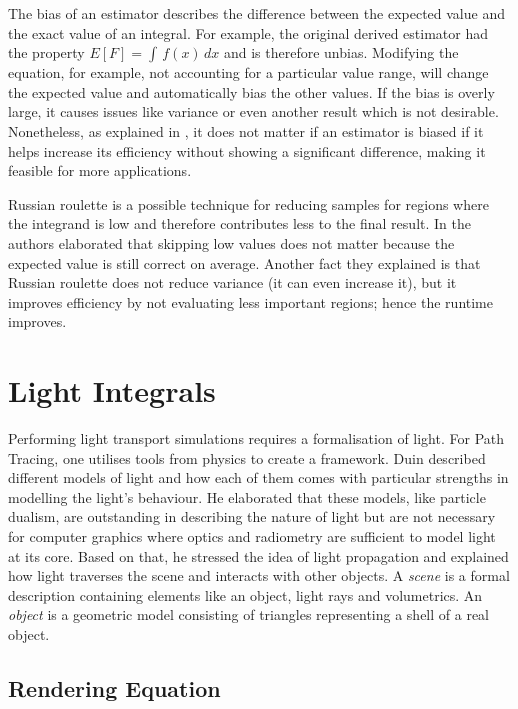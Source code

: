The bias of an estimator describes the difference between the expected value and the exact value of an integral.
For example, the original derived estimator had the property $E[F]=\int\,f(x)\,dx$ and is therefore unbias.
Modifying the equation, for example, not accounting for a particular value range, will change the expected value and automatically bias the other values.
If the bias is overly large, it causes issues like variance or even another result which is not desirable.
Nonetheless, as explained in \cite{kalos_monte_2008}, it does not matter if an estimator is biased if it helps increase its efficiency without showing a significant difference, making it feasible for more applications.

Russian roulette is a possible technique for reducing samples for regions where the integrand is low and therefore contributes less to the final result.
In \cite{pharr_physically_2017} the authors elaborated that skipping low values does not matter because the expected value is still correct on average.
Another fact they explained is that Russian roulette does not reduce variance (it can even increase it), but it improves efficiency by not evaluating less important regions; hence the runtime improves.

\section{Light Integrals}

Performing light transport simulations requires a formalisation of light.
For Path Tracing, one utilises tools from physics to create a framework.
Duin \cite{duin_beleuchtungsalgorithmen_1993} described different models of light and how each of them comes with particular strengths in modelling the light's behaviour.
He elaborated that these models, like particle dualism, are outstanding in describing the nature of light but are not necessary for computer graphics where optics and radiometry are sufficient to model light at its core.
Based on that, he stressed the idea of light propagation and explained how light traverses the scene and interacts with other objects.
A \textit{scene} is a formal description containing elements like an object, light rays and volumetrics.
An \textit{object} is a geometric model consisting of triangles representing a shell of a real object.

\subsection*{Rendering Equation}

